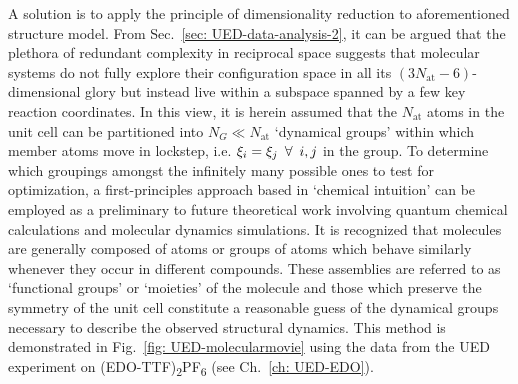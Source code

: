 A solution is to apply the principle of dimensionality reduction to aforementioned structure model.
From Sec.~\ref{sec: UED-data-analysis-2}, it can be argued that the plethora of redundant complexity in
reciprocal space suggests that molecular systems do not fully explore their configuration space
in all its $(3 N_\text{at} - 6)$-dimensional glory but instead live within a subspace spanned
by a few key reaction coordinates.
%
In this view, it is herein assumed that the $N_\text{at}$ atoms in the unit cell
can be partitioned into $N_G \ll N_\text{at}$ `dynamical groups'
within which member atoms move in lockstep, i.e. $\xi_i = \xi_j \enskip \forall \enskip i,j$ in
the group.
%
To determine which groupings amongst the infinitely many possible ones to test for optimization,
a first-principles approach based in `chemical intuition' can be employed as a preliminary to
future theoretical work involving quantum chemical calculations and molecular dynamics simulations.
%
It is recognized that molecules are generally composed of atoms or groups of atoms
which behave similarly whenever they occur in different compounds.
These assemblies are referred to as `functional groups' or `moieties' of the molecule
and those which preserve the symmetry of the unit cell constitute a reasonable guess of the dynamical groups
necessary to describe the observed structural dynamics.
%
This method is demonstrated in Fig.~\ref{fig: UED-molecularmovie} using the data
from the UED experiment on (EDO-TTF)\textsubscript{2}PF\textsubscript{6} (see Ch.~\ref{ch: UED-EDO}).

